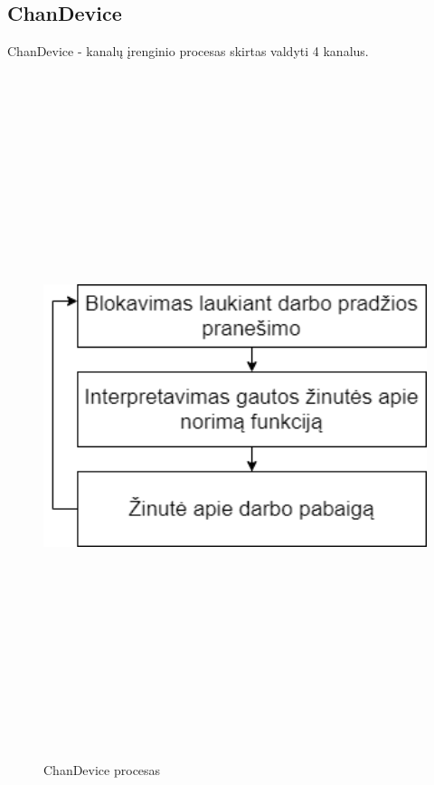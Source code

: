 \documentclass[oneside]{VUMIFPSkursinis}
\begin{document}
\subsection{ChanDevice} ChanDevice - kanalų įrenginio procesas skirtas valdyti 4 kanalus.
\begin{figure}[H]
		\centering	
	\includegraphics[width=18cm,height=20cm,keepaspectratio]{ChanDevice.png}
	\caption{ChanDevice procesas}
	\label{fig:ChanDevice procesas}
\end{figure}
\end{document}
